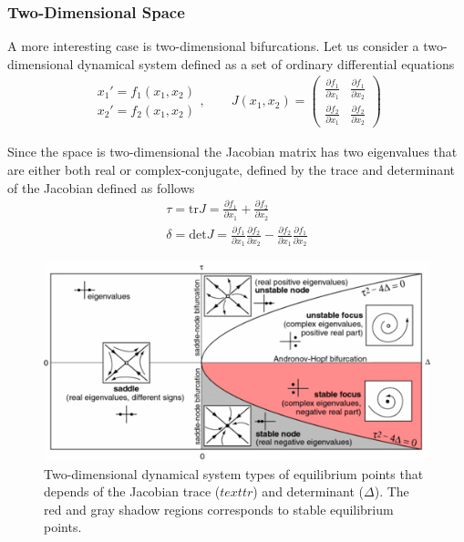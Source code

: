 \subsubsection{Two-Dimensional Space}

A more interesting case is two-dimensional bifurcations. Let us consider a two-dimensional dynamical system defined as a set of ordinary differential equations
\begin{gather*}
\begin{matrix}
x_1'=f_1(x_1,x_2)\\
x_2'=f_2(x_1,x_2)
\end{matrix}, \qquad J(x_1,x_2) = \begin{pmatrix} \frac{\partial f_1}{\partial x_1} & \frac{\partial f_1}{\partial x_2}\\\frac{\partial f_2}{\partial x_1} & \frac{\partial f_2}{\partial x_2}\end{pmatrix}
\end{gather*}

Since the space is two-dimensional the Jacobian matrix has two eigenvalues that are either both real or complex-conjugate, defined by the trace and determinant of the Jacobian defined as follows
\begin{gather*}
    \tau = \text{tr}J = \frac{\partial f_1}{\partial x_1} +\frac{\partial f_2}{\partial x_2}\\
    \delta = \text{det} J = \frac{\partial f_1}{\partial x_1} \frac{\partial f_2}{\partial x_2}- \frac{\partial f_2}{\partial x_1} \frac{\partial f_1}{\partial x_2}
\end{gather*}

\begin{figure}[H]
    \centering
    \includegraphics[width=\linewidth]{Images/2d.png}
    \caption{Two-dimensional dynamical system types of equilibrium points that depends of the Jacobian trace ($text{tr}$) and determinant ($\Delta$). The red and gray shadow regions corresponds to stable equilibrium points.}
    \label{fig:2d}
\end{figure}


